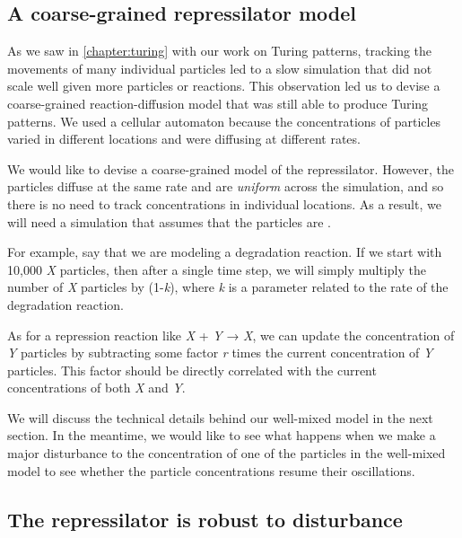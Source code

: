 \FloatBarrier
{}
\subsection{A coarse-grained repressilator model}

As we saw in \autoref{chapter:turing} with our work on Turing patterns, tracking the movements of many individual particles led to a slow simulation that did not scale well given more particles or reactions. This observation led us to devise a coarse-grained reaction-diffusion model that was still able to produce Turing patterns. We used a cellular automaton because the concentrations of particles varied in different locations and were diffusing at different rates.

We would like to devise a coarse-grained model of the repressilator. However, the particles diffuse at the same rate and are \textit{uniform} across the simulation, and so there is no need to track concentrations in individual locations. As a result, we will need a simulation that assumes that the particles are .

For example, say that we are modeling a degradation reaction. If we start with 10,000 \textit{X} particles, then after a single time step, we will simply multiply the number of \textit{X} particles by (1-\textit{k}), where \textit{k} is a parameter related to the rate of the degradation reaction.

As for a repression reaction like \textit{X} + \textit{Y} → \textit{X}, we can update the concentration of \textit{Y} particles by subtracting some factor \textit{r} times the current concentration of \textit{Y} particles. This factor should be directly correlated with the current concentrations of both \textit{X} and \textit{Y}.

We will discuss the technical details behind our well-mixed model in the next section. In the meantime, we would like to see what happens when we make a major disturbance to the concentration of one of the particles in the well-mixed model to see whether the particle concentrations resume their oscillations. 


\FloatBarrier
{}
\subsection{The repressilator is robust to disturbance}

